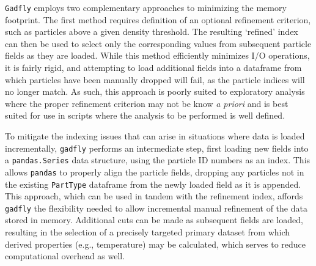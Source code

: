 \documentclass{thesis}
\newcommand{\code}[1]{\texttt{#1}}
\begin{document}
\code{Gadfly} employs two complementary approaches to minimizing the memory footprint.
The first method requires definition of an optional refinement criterion, such as particles above a given density threshold.
The resulting `refined' index can then be used to select only the corresponding values from subsequent particle fields as they are loaded.
While this method efficiently minimizes I/O operations, it is fairly rigid, and attempting to load additional fields into a dataframe from which particles have been manually dropped will fail, as the particle indices will no longer match.  
As such, this approach is poorly suited to exploratory analysis where the proper refinement criterion may not be know \textit{a priori} and is best suited for use in scripts where the analysis to be performed is well defined.

To mitigate the indexing issues that can arise in situations where data is loaded incrementally, \code{gadfly} performs an intermediate step, first loading new fields into a \code{pandas.Series} data structure, using the particle ID numbers as an index.  This allows \code{pandas} to properly align the particle fields, dropping any particles not in the existing \code{PartType} dataframe from the newly loaded field as it is appended.
This approach, which can be used in tandem with the refinement index, affords \code{gadfly} the flexibility needed to allow incremental manual refinement of the data stored in memory. 
Additional cuts can be made as subsequent fields are loaded, resulting in the selection of a precisely targeted primary dataset from which derived  properties (e.g., temperature) may be calculated, which serves to reduce computational overhead as well.
\end{document}
